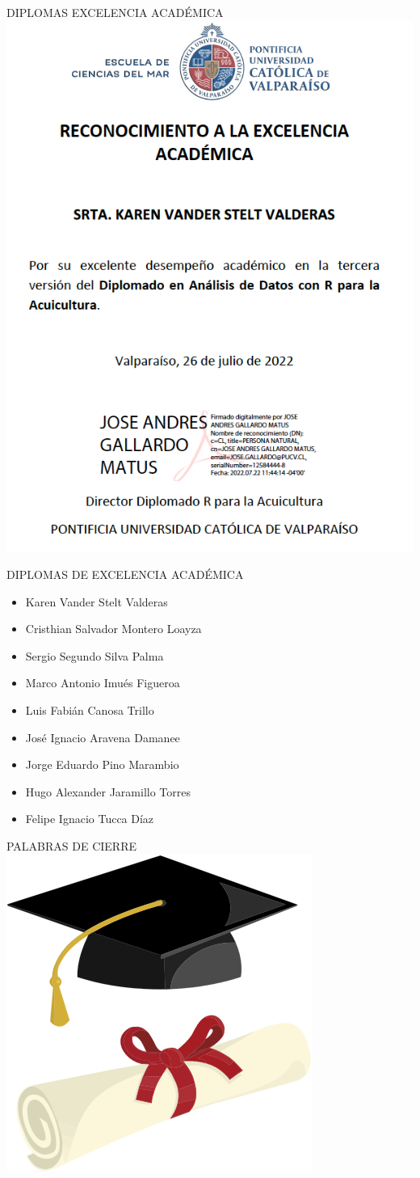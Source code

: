 \documentclass[
  ignorenonframetext,
]{beamer}
\providecommand{\tightlist}{%
  \setlength{\itemsep}{0pt}\setlength{\parskip}{0pt}}
\begin{document}
\begin{frame}{DIPLOMAS EXCELENCIA ACADÉMICA}
\protect\hypertarget{diplomas-excelencia-acaduxe9mica}{}
\includegraphics[width=0.6\linewidth]{Diploma}
\end{frame}

\begin{frame}{DIPLOMAS DE EXCELENCIA ACADÉMICA}
\protect\hypertarget{diplomas-de-excelencia-acaduxe9mica}{}
\begin{itemize}
\tightlist
\item
  Karen Vander Stelt Valderas
\item
  Cristhian Salvador Montero Loayza
\item
  Sergio Segundo Silva Palma
\item
  Marco Antonio Imués Figueroa
\item
  Luis Fabián Canosa Trillo
\item
  José Ignacio Aravena Damanee
\item
  Jorge Eduardo Pino Marambio
\item
  Hugo Alexander Jaramillo Torres
\item
  Felipe Ignacio Tucca Díaz
\end{itemize}
\end{frame}

\begin{frame}{PALABRAS DE CIERRE}
\protect\hypertarget{palabras-de-cierre}{}
\includegraphics[width=0.6\linewidth]{Graduacion}
\end{frame}
\end{document}

